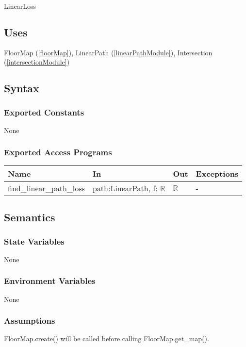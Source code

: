 \documentclass[12pt, titlepage]{article}
\begin{document}
LinearLoss

\subsection{Uses}
FloorMap (\autoref{floorMap}), LinearPath (\autoref{linearPathModule}), Intersection (\autoref{intersectionModule})

\subsection{Syntax}

\subsubsection{Exported Constants}

None

\subsubsection{Exported Access Programs}

\begin{center}
\begin{tabular}{p{4cm} p{3cm} p{3cm} p{4cm}}
\hline
\textbf{Name} & \textbf{In} & \textbf{Out} & \textbf{Exceptions} \\
\hline
find\_linear\_path\_loss & path:LinearPath, f: $\mathbb{R}$ & $\mathbb{R}$ & - \\
\hline
\end{tabular}
\end{center}

\subsection{Semantics}

\subsubsection{State Variables} None

\subsubsection{Environment Variables} None

\subsubsection{Assumptions} FloorMap.create() will be called before calling FloorMap.get\_map().
\end{document}

